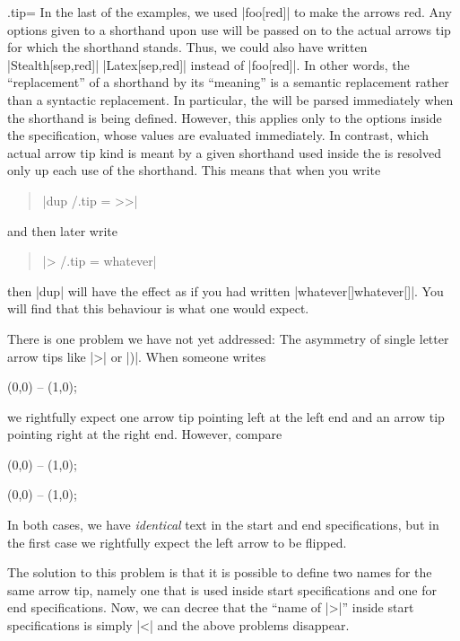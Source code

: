\begin{handler}{{.tip}{=}}
    In the last of the examples, we used |foo[red]| to make the arrows red. Any
    options given to a shorthand upon use will be passed on to the actual
    arrows tip for which the shorthand stands. Thus, we could also have written
    |Stealth[sep,red]| |Latex[sep,red]| instead of |foo[red]|. In other words,
    the ``replacement'' of a shorthand by its ``meaning'' is a semantic
    replacement rather than a syntactic replacement. In particular, the
     will be parsed immediately when the shorthand is
    being defined. However, this applies only to the options inside the
    specification, whose values are evaluated immediately. In contrast, which
    actual arrow tip kind is meant by a given shorthand used inside the
     is resolved only up each use of the shorthand.
    This means that when you write
    \begin{quote}
        |dup /.tip = >>|
    \end{quote}
    and then later write
    \begin{quote}
        |> /.tip = whatever|
    \end{quote}
    then |dup| will have the effect as if you had written
    |whatever[]whatever[]|. You will find that this behaviour is what one would
    expect.

    There is one problem we have not yet addressed: The asymmetry of single
    letter arrow tips like |>| or |)|. When someone writes
\begin{codeexample}[]
\tikz \draw [<->] (0,0) -- (1,0);
\end{codeexample}
    we rightfully expect one arrow tip pointing left at the left end and an
    arrow tip pointing right at the right end. However, compare
\begin{codeexample}[]
\tikz \draw [>->] (0,0) -- (1,0);
\end{codeexample}
\begin{codeexample}[preamble={\usetikzlibrary{arrows.meta}}]
\tikz {} (0,0) -- (1,0);
\end{codeexample}
    In both cases, we have \emph{identical} text in the start and end
    specifications, but in the first case we rightfully expect the left arrow
    to be flipped.

    The solution to this problem is that it is possible to define two names for
    the same arrow tip, namely one that is used inside start specifications and
    one for end specifications. Now, we can decree that the ``name of |>|''
    inside start specifications is simply |<| and the above problems disappear.


\end{handler}
